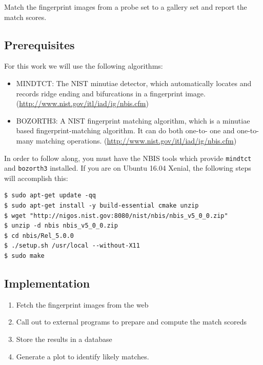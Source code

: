 Match the fingerprint images from a probe set to a gallery set and
report the match scores.

\subsection{Prerequisites}\label{prerequisites}

For this work we will use the following algorithms:

\begin{itemize}
\tightlist
\item
  MINDTCT: The NIST minutiae detector, which automatically locates and
  records ridge ending and bifurcations in a fingerprint image.
  (\url{http://www.nist.gov/itl/iad/ig/nbis.cfm})
\item
  BOZORTH3: A NIST fingerprint matching algorithm, which is a minutiae
  based fingerprint-matching algorithm. It can do both one-to- one and
  one-to- many matching operations.
  (\url{http://www.nist.gov/itl/iad/ig/nbis.cfm})
\end{itemize}

In order to follow along, you must have the NBIS tools which provide
\texttt{mindtct} and \texttt{bozorth3} installed. If you are on Ubuntu
16.04 Xenial, the following steps will accomplish this:

\begin{verbatim}
$ sudo apt-get update -qq
$ sudo apt-get install -y build-essential cmake unzip
$ wget "http://nigos.nist.gov:8080/nist/nbis/nbis_v5_0_0.zip"
$ unzip -d nbis nbis_v5_0_0.zip
$ cd nbis/Rel_5.0.0
$ ./setup.sh /usr/local --without-X11
$ sudo make
\end{verbatim}

\subsection{Implementation}\label{implementation}

\begin{enumerate}
\def\labelenumi{\arabic{enumi}.}
\tightlist
\item
  Fetch the fingerprint images from the web
\item
  Call out to external programs to prepare and compute the match scoreds
\item
  Store the results in a database
\item
  Generate a plot to identify likely matches.
\end{enumerate}

